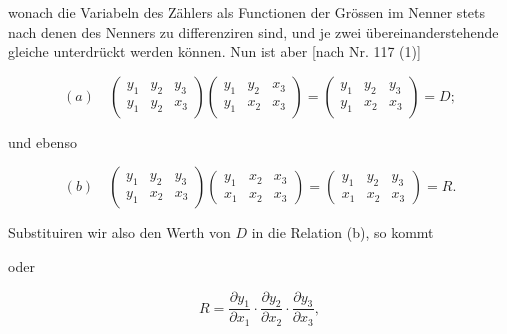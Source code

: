 wonach die Variabeln des Zählers als Functionen der Grössen im
Nenner stets nach denen des Nenners zu differenziren sind, und je zwei
übereinanderstehende gleiche unterdrückt werden können. Nun ist
aber [nach Nr. 117 (1)]

\[
(a) \quad \begin{pmatrix} y_1 & y_2 & y_3 \\ y_1 & y_2 & x_3 \end{pmatrix} \begin{pmatrix} y_1 & y_2 & x_3 \\ y_1 & x_2 & x_3 \end{pmatrix} = \begin{pmatrix} y_1 & y_2 & y_3 \\ y_1 & x_2 & x_3 \end{pmatrix} = D;
\]

und ebenso

\[
(b) \quad \begin{pmatrix} y_1 & y_2 & y_3 \\ y_1 & x_2 & x_3 \end{pmatrix} \begin{pmatrix} y_1 & x_2 & x_3 \\ x_1 & x_2 & x_3 \end{pmatrix} = \begin{pmatrix} y_1 & y_2 & y_3 \\ x_1 & x_2 & x_3 \end{pmatrix} = R.
\]

Substituiren wir also den Werth von $D$ in die Relation (b), so kommt


oder

\[
R = \dfrac{\partial y_1}{\partial x_1} \cdot \dfrac{\partial y_2}{\partial x_2} \cdot \dfrac{\partial y_3}{\partial x_3}, \tag{II}
\]

